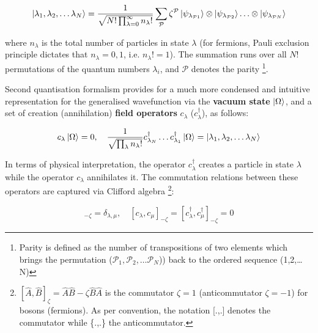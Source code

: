 \begin{equation}
    \ket{\lambda_{1}, \lambda_{2},\ldots \lambda_{N}} = \frac{1}{\sqrt{N! \prod_{\lambda=0}^{\infty}n_{\lambda}!}} \sum_{\mathcal{P}}\zeta^{\mathcal{P}} \ket{\psi_{\lambda_{\mathcal{P}1}}} \otimes \ket{\psi_{\lambda_{\mathcal{P}2}}} \ldots \otimes \ket{\psi_{\lambda_{\mathcal{P}N}}}
\end{equation}

where $n_{\lambda}$ is the total number of particles in state $\lambda$ (for fermions, Pauli exclusion principle dictates that $n_{\lambda} = 0,1$, i.e. $n_{\lambda}! = 1$). The summation runs over all $N!$ permutations of the quantum numbers $\lambda_{i}$, and $\mathcal{P}$ denotes the parity \footnote{Parity is defined as the number of transpositions of two elements which brings the permutation ($\mathcal{P}_1, \mathcal{P}_2,\ldots \mathcal{P}_{N}$)) back to the ordered sequence (1,2,\ldots N)}. \par

Second quantisation formalism provides for a much more condensed and intuitive representation for the generalised wavefunction via the \textbf{vacuum state} $\ket{\Omega}$, and a set of creation (annihilation) \textbf{field operators} $c_{\lambda}$ ($c_{\lambda}^{\dagger}$), as follows:

\begin{equation}
\label{eq:eq1}
    c_{\lambda} \ket{\Omega} = 0, \quad \frac{1}{\sqrt{\prod_{\lambda}n_{\lambda}!}} c_{\lambda_N}^{\dagger} \ldots c_{\lambda_1}^{\dagger} \ket{\Omega} = \ket{\lambda_{1}, \lambda_{2},\ldots \lambda_{N}}
\end{equation}

In terms of physical interpretation, the operator $c_{\lambda}^{\dagger}$ creates a particle in state $\lambda$ while the operator $c_{\lambda}$ annihilates it. The commutation relations between these operators are captured via Clifford algebra \footnote{$[\hat{A},\hat{B}]_{\zeta} = \hat{A}\hat{B}-\zeta \hat{B}\hat{A}$ is the commutator $\zeta = 1$ (anticommutator $\zeta = -1$) for bosons (fermions). As per convention, the notation [.,.] denotes the commutator while \{.,.\} the anticommutator.}:

\begin{equation}
    [c_{\lambda},c_{\mu}^{\dagger}]_{-\zeta} = \delta_{\lambda,\mu}, \quad [c_{\lambda},c_{\mu}]_{-\zeta} = [c_{\lambda}^{\dagger},c_{\mu}^{\dagger}]_{-\zeta} = 0
\end{equation}

